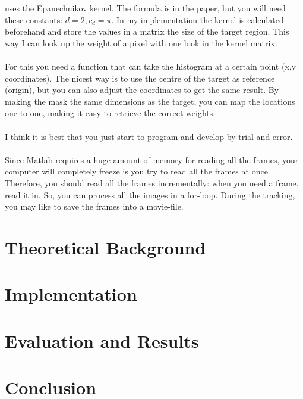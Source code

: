 \documentclass[a4paper,11pt]{article}
\begin{document}
		uses the Epanechnikov kernel. The formula is in the paper, but you
		will need these constants: $d = 2, c_d = \pi$. In my implementation
		the kernel is calculated beforehand and store the values in a matrix
		the size of the target region. This way I can look up the weight of
		a pixel with one look in the kernel matrix.
		\\ \\
		For this you need a function that can take the histogram at a certain
		point (x,y coordinates). The nicest way is to use the centre of the
		target as reference (origin), but you can also adjust the coordinates
		to get the same result. By making the mask the same dimensions as the
		target, you can map the locations one-to-one, making it easy to retrieve
		the correct weights.
		\\ \\
		I think it is best that you just start to program and develop by trial
		and error.
		\\ \\
		Since Matlab requires a huge amount of memory for reading all the frames,
		your computer will completely freeze is you try to read all the frames at
		once. Therefore, you should read all the frames incrementally: when you
		need a frame, read it in. So, you can process all the images in a for-loop.
		During the tracking, you may like to save the frames into a movie-file.

	\section*{Theoretical Background}

	\section*{Implementation}

	\section*{Evaluation and Results}

	\section*{Conclusion}
\end{document}

